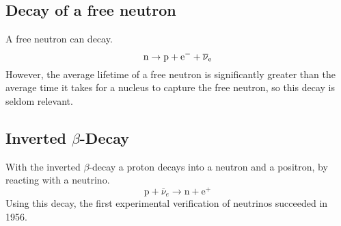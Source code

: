 \subsection{Decay of a free neutron}
A free neutron can decay. 
$${\hbox{n}}\to {\hbox{p}}+{\hbox{e}}^{-}+\overline {\nu }_{{{\mathrm {e}}}}$$
However, the average lifetime of a free neutron is significantly greater than the average time it takes for a nucleus to capture the free neutron, so this decay is seldom relevant.
\subsection{Inverted $\beta$-Decay}
With the inverted $\beta$-decay a proton decays into a neutron and a positron, by reacting with a neutrino.
$${\displaystyle \mathrm {p} +{\overline {\nu }}_{e}\to \mathrm {n} +\mathrm {e} ^{+}}$$
Using this decay, the first experimental verification of neutrinos succeeded in 1956.
